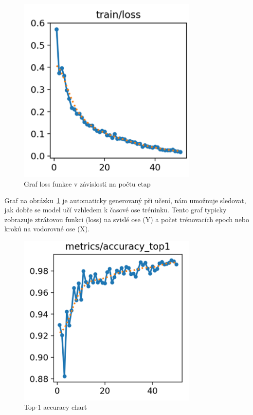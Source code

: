 \begin{figure}[htbp]
    \centering
    \includegraphics[width=0.8\textwidth]{img/loss_funkce}
    \caption{Graf loss funkce v závislosti na počtu etap}
    \label{fig:loss_funkce}
\end{figure}

Graf na obrázku~\ref{fig:loss_funkce} je automaticky generovaný při učení, nám umožnuje sledovat, jak dobře se model učí vzhledem k časové ose tréninku.
Tento graf typicky zobrazuje ztrátovou funkci (loss) na svislé ose (Y) a počet trénovacích epoch nebo kroků na vodorovné ose (X).

\begin{figure}[htbp]
    \centering
    \includegraphics[width=0.8\textwidth]{img/top1_accuracy}
    \caption{Top-1 accuracy chart}
    \label{fig:top1_accuracy}
\end{figure}

